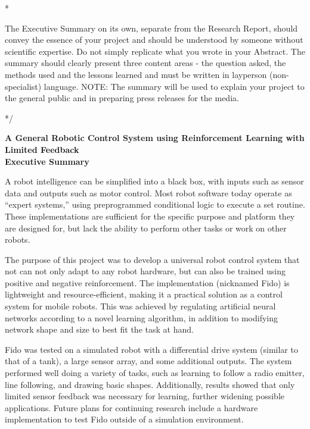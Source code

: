 \documentclass[letterpaper,12pt]{article}
\begin{document}
\/*

The Executive Summary on its own, separate from the Research Report, should convey the essence of your project and should be understood by someone without scientific expertise. Do not simply replicate what you wrote in your Abstract. The summary should clearly present three content areas - the question asked, the methods used and the lessons learned and must be written in layperson (non-specialist) language. NOTE: The summary will be used to explain your project to the general public and in preparing press releases for the media.

*/

\begin{center}
	{\Large
	\textbf{A General Robotic Control System using Reinforcement Learning with Limited Feedback}}\\
	\vspace{1cm}
	{\large \textbf{Executive Summary}}
\end{center}

\noindent

A robot intelligence can be simplified into a black box, with inputs such as sensor data and outputs such as motor control.  Most robot software today operate as ``expert systems,'' using preprogrammed conditional logic to execute a set routine.  These implementations are sufficient for the specific purpose and platform they are designed for, but lack the ability to perform other tasks or work on other robots.

The purpose of this project was to develop a universal robot control system that not can not only adapt to any robot hardware, but can also be trained using positive and negative reinforcement.  The implementation (nicknamed Fido) is lightweight and resource-efficient, making it a practical solution as a control system for mobile robots.  This was achieved by regulating artificial neural networks according to a novel learning algorithm, in addition to modifying network shape and size to best fit the task at hand.

Fido was tested on a simulated robot with a differential drive system (similar to that of a tank), a large sensor array, and some additional outputs.  The system performed well doing a variety of tasks, such as learning to follow a radio emitter, line following, and drawing basic shapes.  Additionally, results showed that only limited sensor feedback was necessary for learning, further widening possible applications.  Future plans for continuing research include a hardware implementation to test Fido outside of a simulation environment.
\end{document}
